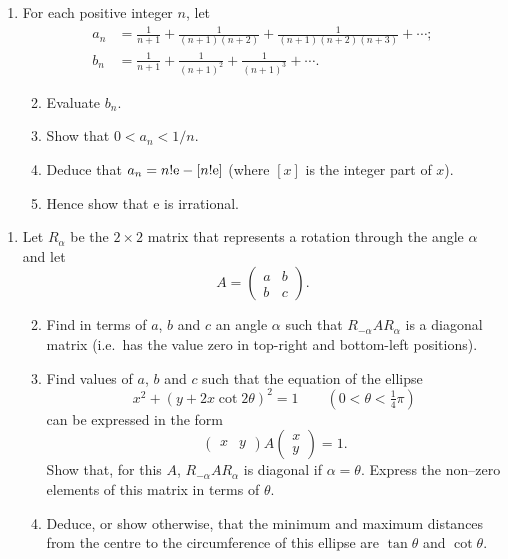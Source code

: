 \documentclass[a4, 11pt]{report}
\newlength{\qspace}
\newcounter{qnumber}
\newenvironment{question}%
 {\vspace{\qspace}
  \begin{enumerate}[\bfseries 1\quad][10]%
    \setcounter{enumi}{\value{qnumber}}%
    \item%
 }
{
  \end{enumerate}
  \filbreak
  \stepcounter{qnumber}
 }
\newenvironment{questionparts}[1][1]%
 {
  \begin{enumerate}[\bfseries (i)]%
    \setcounter{enumii}{#1}
    \addtocounter{enumii}{-1}
    \setlength{\itemsep}{5mm}
    \setlength{\parskip}{8pt}
 }
 {
  \end{enumerate}
 }
\begin{document}
\begin{question}
 For each positive integer $n$,
let
\begin{align*}
a_n&=\frac1{n+1}+\frac1{(n+1)(n+2)}+\frac1{(n+1)(n+2)(n+3)}+\cdots;\\
b_n&=\frac1{n+1}+\frac1{(n+1)^2}+\frac1{(n+1)^3}+\cdots.
\end{align*}

\begin{questionparts}
\item Evaluate $b_n$.

\item Show that $0<a_n<1/n$.

\item Deduce that $a_n=n!{\rm e}-[n!{\rm e}]$ (where $[x]$ is
the integer part of $x$).

\item Hence show that $\mathrm{e}$ is irrational.
\end{questionparts}
\end{question}
		
\begin{question}	
Let $R_{\alpha}$ be
the $2\times2$ matrix that represents a rotation through the
angle $\alpha$ and let
$$A=\begin{pmatrix}a&b\\b&c\end{pmatrix}.$$

\begin{questionparts}
\item Find in
terms of $a$, $b$ and $c$ an angle $\alpha$ such that
$R_{-\alpha}AR_{\alpha}$ is a diagonal matrix (i.e.\ has the
value zero in top-right and bottom-left positions).

\item Find values of $a$, $b$ and $c$ such that the equation of the
ellipse
\[x^2+(y+2x\cot2\theta)^2=1\qquad(0<\theta<\tfrac{1}{4}\pi)\]
can be expressed in the form
\[\begin{pmatrix}x&y\end{pmatrix}A\begin{pmatrix}x\\y\end{pmatrix}=1.\]
Show that, for this $A$,  $R_{-\alpha}AR_{\alpha}$ is  diagonal if
 $\alpha=\theta$. Express the non--zero elements
of this matrix in terms of $\theta$.

\item Deduce, or show otherwise,  that the minimum and maximum distances from
the centre to the circumference of this ellipse
 are
$\tan\theta$ and $\cot\theta$.
\end{questionparts}
\end{question}	
		
\end{document}
